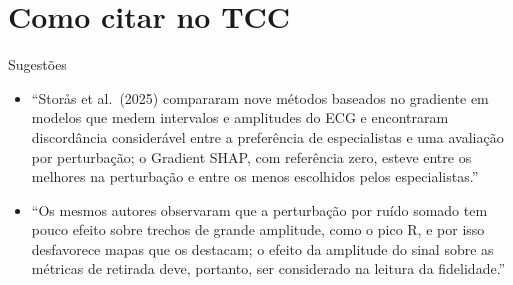 \documentclass[11pt,a4paper]{article}
\begin{document}
\section{Como citar no TCC}
\begin{infobox}[ok]{Sugestões}
\begin{itemize}
\item “Storås et al.\ (2025) compararam nove métodos baseados no gradiente em modelos que medem intervalos e amplitudes do ECG e encontraram discordância considerável entre a preferência de especialistas e uma avaliação por perturbação; o Gradient SHAP, com referência zero, esteve entre os melhores na perturbação e entre os menos escolhidos pelos especialistas.”
\item “Os mesmos autores observaram que a perturbação por ruído somado tem pouco efeito sobre trechos de grande amplitude, como o pico R, e por isso desfavorece mapas que os destacam; o efeito da amplitude do sinal sobre as métricas de retirada deve, portanto, ser considerado na leitura da fidelidade.”
\end{itemize}
\end{infobox}
\end{document}

